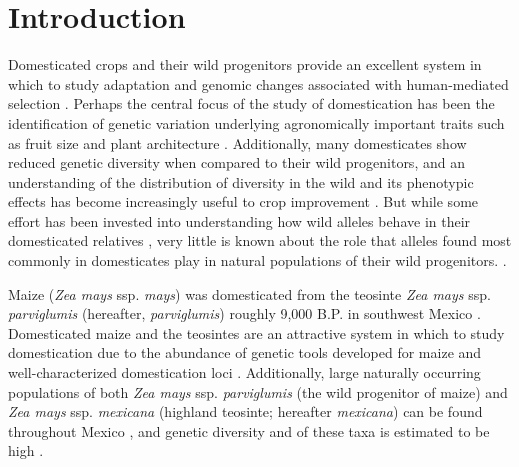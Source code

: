 \documentclass[12pt]{article}
\begin{document}
\clearpage

\section*{Introduction}

Domesticated crops and their wild progenitors provide an excellent system in which to study adaptation and genomic changes associated with human-mediated selection \citep{Ross-Ibarra2007}. Perhaps the central focus of the study of domestication has been the identification of genetic variation underlying agronomically important traits such as fruit size and plant architecture \citep{OlsenGross2010}. Additionally, many domesticates show reduced genetic diversity when compared to their wild progenitors, and an understanding of the distribution of diversity in the wild and its phenotypic effects has become increasingly useful to crop improvement \citep{KovachMcCouch2008}. But while some effort has been invested into understanding how wild alleles behave in their domesticated relatives \citep{Bai2007}, very little is known about the role that alleles found most commonly in domesticates play in natural populations of their wild progenitors.
\citep{Whitton1997}.

Maize (\emph{Zea mays} ssp. \emph{mays}) was domesticated from the teosinte \emph{Zea mays} ssp. \emph{parviglumis} (hereafter, \emph{parviglumis}) roughly 9,000 B.P. in southwest Mexico \citep{Piperno2009, Matsuoka2002}. Domesticated maize and the teosintes are an attractive system in which to study domestication due to the abundance of genetic tools developed for maize and well-characterized domestication loci \citep{Hufford2012a, Doebley2004, Hufford2012b}. Additionally, large naturally occurring populations of both \emph{Zea mays} ssp. \emph{parviglumis} (the wild progenitor of maize) and \emph{Zea mays} ssp. \emph{mexicana} (highland teosinte; hereafter \emph{mexicana}) can be found throughout Mexico \citep{Wilkes1977, Hufford2013}, and genetic diversity and of these taxa is estimated to be high \citep{Ross-Ibarra2009}.
\end{document}
